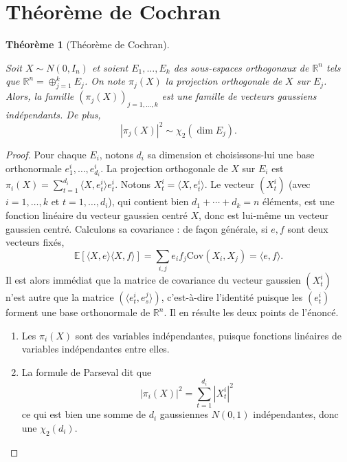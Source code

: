 \documentclass[
  10,
  letterpaper,
  DIV=11,
  numbers=noendperiod]{scrreport}
\providecommand{\tightlist}{%
  \setlength{\itemsep}{0pt}\setlength{\parskip}{0pt}}\usepackage{longtable,booktabs,array}
\theoremstyle{plain}
\newtheorem{theorem}{Théorème}[chapter]
\theoremstyle{definition}
\theoremstyle{plain}
\theoremstyle{definition}
\theoremstyle{definition}
\theoremstyle{plain}
\theoremstyle{remark}
\begin{document}
\hypertarget{thuxe9oruxe8me-de-cochran}{%
\section{Théorème de Cochran}\label{thuxe9oruxe8me-de-cochran}}

\begin{theorem}[Théorème de
Cochran]\protect\hypertarget{thm-cochran}{}\label{thm-cochran}

Soit \(X \sim N(0,I_n)\) et soient \(E_1, \dotsc, E_k\) des sous-espaces
orthogonaux de \(\mathbb{R}^n\) tels que
\(\mathbb{R}^n = \oplus_{j=1}^k E_j\). On note \(\pi_j(X)\) la
projection orthogonale de \(X\) sur \(E_j\). Alors, la famille
\((\pi_j(X))_{j = 1, \dotsc, k}\) est une famille de vecteurs gaussiens
indépendants. De plus, \[ |\pi_j(X)|^2 \sim \chi_2(\dim E_j).\]

\end{theorem}

\begin{proof}

Pour chaque \(E_i\), notons \(d_i\) sa dimension et choisissons-lui une
base orthonormale \(e^i_1, \dotsc, e^i_{d_i}\). La projection
orthogonale de \(X\) sur \(E_i\) est
\(\pi_i(X)= \sum_{t=1}^{d_i} \langle X, e^i_t\rangle e^i_t\). Notons
\(X^i_t=\langle X, e^i_t\rangle\). Le vecteur \((X^i_t)\) (avec
\(i=1, \dotsc, k\) et \(t = 1, \dotsc, d_i\)), qui contient bien
\(d_1+\dotsb+d_k=n\) éléments, est une fonction linéaire du vecteur
gaussien centré \(X\), donc est lui-même un vecteur gaussien centré.
Calculons sa covariance : de façon générale, si \(e,f\) sont deux
vecteurs fixés,
\[\mathbb{E}[\langle X, e\rangle \langle X, f\rangle] = \sum_{i,j}e_if_j \mathrm{Cov}(X_i, X_j) = \langle e, f\rangle.\]
Il est alors immédiat que la matrice de covariance du vecteur gaussien
\((X^i_t)\) n'est autre que la matrice
\((\langle e^i_t, e^j_s \rangle)\), c'est-à-dire l'identité puisque les
\((e^i_t)\) forment une base orthonormale de \(\mathbb{R}^n\). Il en
résulte les deux points de l'énoncé.

\begin{enumerate}
\def\labelenumi{\arabic{enumi}.}
\tightlist
\item
  Les \(\pi_i(X)\) sont des variables indépendantes, puisque fonctions
  linéaires de variables indépendantes entre elles.
\item
  La formule de Parseval dit que
  \[|\pi_i(X)|^2 = \sum_{t=1}^{d_i}|X^i_t|^2 \] ce qui est bien une
  somme de \(d_i\) gaussiennes \(N(0,1)\) indépendantes, donc une
  \(\chi_2(d_i)\).
\end{enumerate}

\end{proof}
\end{document}

